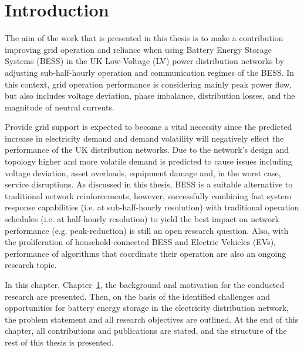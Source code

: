 \chapter{Introduction}
\label{ch-introduction}

The aim of the work that is presented in this thesis is to make a contribution improving grid operation and reliance when using Battery Energy Storage Systems (BESS) in the UK Low-Voltage (LV) power distribution networks by adjusting sub-half-hourly operation and communication regimes of the BESS.
In this context, grid operation performance is considering mainly peak power flow, but also includes voltage deviation, phase imbalance, distribution losses, and the magnitude of neutral currents.

Provide grid support is expected to become a vital necessity since the predicted increase in electricity demand and demand volatility will negatively effect the performance of the UK distribution networks.
Due to the network's design and topology higher and more volatile demand is predicted to cause issues including voltage deviation, asset overloads, equipment damage and, in the worst case, service disruptions.
As discussed in this thesis, BESS is a suitable alternative to traditional network reinforcements, however, successfully combining fast system response capabilities (i.e. at sub-half-hourly resolution) with traditional operation schedules (i.e. at half-hourly resolution) to yield the best impact on network performance (e.g. peak-reduction) is still an open research question.
Also, with the proliferation of household-connected BESS and Electric Vehicles (EVs), performance of algorithms that coordinate their operation are also an ongoing research topic.

In this chapter, Chapter~\ref{ch-introduction}, the background and motivation for the conducted research are presented.
Then, on the basis of the identified challenges and opportunities for battery energy storage in the electricity distribution network, the problem statement and all research objectives are outlined.
At the end of this chapter, all contributions and publications are stated, and the structure of the rest of this thesis is presented.









